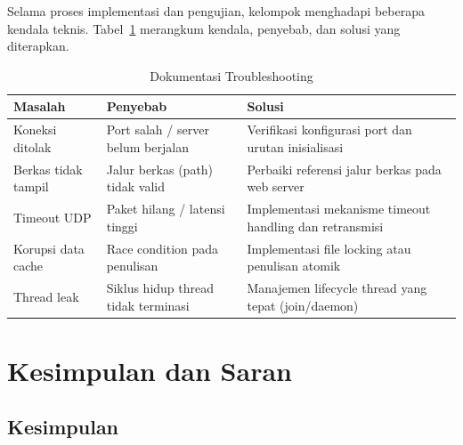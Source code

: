 \documentclass[11pt,a4paper]{article}
\begin{document}
Selama proses implementasi dan pengujian, kelompok menghadapi beberapa kendala teknis. Tabel~\ref{tab:troubleshoot} merangkum kendala, penyebab, dan solusi yang diterapkan.

\begin{table}[H]
\centering
\caption{Dokumentasi Troubleshooting}
\label{tab:troubleshoot}
\renewcommand{\arraystretch}{1.2}
\begin{tabular}{p{3.2cm} p{4.5cm} p{6.5cm}}
\toprule
\rowcolor{tableheader}
\textbf{Masalah} & \textbf{Penyebab} & \textbf{Solusi} \\
\midrule
Koneksi ditolak & Port salah / server belum berjalan & Verifikasi konfigurasi port dan urutan inisialisasi \\
\midrule
Berkas tidak tampil & Jalur berkas (path) tidak valid & Perbaiki referensi jalur berkas pada web server \\
\midrule
Timeout UDP & Paket hilang / latensi tinggi & Implementasi mekanisme timeout handling dan retransmisi \\
\midrule
Korupsi data cache & Race condition pada penulisan & Implementasi file locking atau penulisan atomik \\
\midrule
Thread leak & Siklus hidup thread tidak terminasi & Manajemen lifecycle thread yang tepat (join/daemon) \\
\bottomrule
\end{tabular}
\end{table}


\section{Kesimpulan dan Saran}

\subsection{Kesimpulan}
\end{document}
